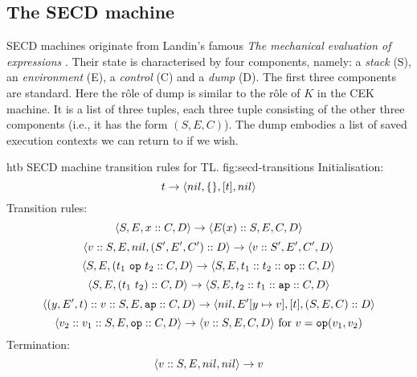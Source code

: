 \documentclass[class=article, crop=false]{standalone}
\begin{document}
\subsection{The SECD machine}

SECD machines originate from Landin's famous
\emph{The mechanical evaluation of expressions} \cite{landin-secd}. Their state
is characterised by four components, namely: a \emph{stack} (S),
an \emph{environment} (E), a \emph{control} (C) and a \emph{dump} (D). The first
three components are standard. Here the rôle of dump is similar to the rôle of
$K$ in the CEK machine. It is a list of three tuples, each three tuple consisting
of the other three components (i.e., it has the form $(S, E, C)$). The dump
embodies a list of saved execution contexts we can return to if we wish.

\begin{myfigure}[.8]{htb}
{SECD machine transition rules for TL.}
{fig:secd-transitions}
Initialisation:
$$ t \to \langle nil, \{\}, [t], nil \rangle $$
%
Transition rules:
$$ \langle S, E, x :: C, D \rangle \to \langle E(x) :: S, E, C, D \rangle $$
$$ \langle v :: S, E, nil, (S', E', C') :: D \rangle \to \langle v :: S', E', C', D \rangle $$
$$ \langle S, E, (t_1\ \mathtt{op}\ t_2 :: C, D \rangle \to \langle S, E, t_1 :: t_2 :: \mathtt{op} :: C, D \rangle $$
$$ \langle S, E, (t_1\ t_2) :: C, D \rangle \to \langle S, E, t_2 :: t_1 :: \mathtt{ap} :: C, D \rangle $$
$$ \langle (y, E', t) :: v :: S, E, \mathtt{ap} :: C, D \rangle \to \langle nil, E'[y \mapsto v], [t], (S, E, C) :: D \rangle $$
$$ \langle v_2 :: v_1 :: S, E, \mathtt{op} :: C, D \rangle \to \langle v :: S, E, C, D \rangle \text{ for } v = \mathtt{op}(v_1, v_2) $$
%
Termination:
$$ \langle v :: S, E, nil, nil \rangle \to v $$
\end{myfigure}
\end{document}
